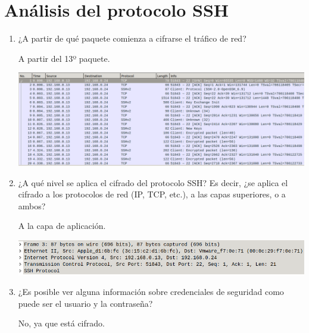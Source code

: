 \documentclass{article}
\begin{document}
\newpage

\section{Análisis del protocolo SSH}

\begin{enumerate}
\item ¿A partir de qué paquete comienza a cifrarse el tráfico de red?

A partir del 13º paquete.

\begin{center}
\includegraphics[scale=0.3]{images/ssh.png}
\end{center}
\item ¿A qué nivel se aplica el cifrado del protocolo SSH? Es decir, ¿se aplica el
cifrado a los protocolos de red (IP, TCP, etc.), a las capas superiores, o a
ambos?

A la capa de aplicación.

\begin{center}
\includegraphics[scale=0.3]{images/capas.png}
\end{center}
\item ¿Es posible ver alguna información sobre credenciales de seguridad como
puede ser el usuario y la contraseña?

No, ya que está cifrado.
\end{enumerate}
\end{document}

